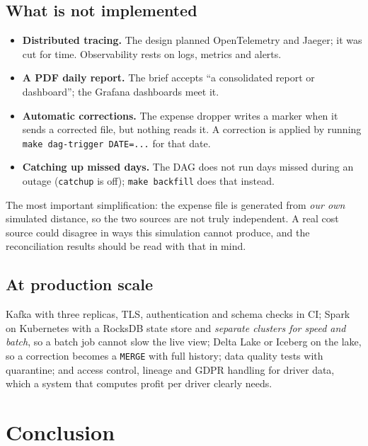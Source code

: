 \documentclass[11pt,a4paper]{article}
\begin{document}
\subsection{What is not implemented}

\begin{itemize}
  \item \textbf{Distributed tracing.} The design planned OpenTelemetry and Jaeger; it
  was cut for time. Observability rests on logs, metrics and alerts.
  \item \textbf{A PDF daily report.} The brief accepts ``a consolidated report or
  dashboard''; the Grafana dashboards meet it.
  \item \textbf{Automatic corrections.} The expense dropper writes a marker when it
  sends a corrected file, but nothing reads it. A correction is applied by running
  \texttt{make dag-trigger DATE=...} for that date.
  \item \textbf{Catching up missed days.} The DAG does not run days missed during an
  outage (\texttt{catchup} is off); \texttt{make backfill} does that instead.
\end{itemize}

The most important simplification: the expense file is generated from \emph{our own}
simulated distance, so the two sources are not truly independent. A real cost source
could disagree in ways this simulation cannot produce, and the reconciliation results
should be read with that in mind.

\subsection{At production scale}

Kafka with three replicas, TLS, authentication and schema checks in CI; Spark on
Kubernetes with a RocksDB state store and \emph{separate clusters for speed and batch},
so a batch job cannot slow the live view; Delta Lake or Iceberg on the lake, so a
correction becomes a \texttt{MERGE} with full history; data quality tests with
quarantine; and access control, lineage and GDPR handling for driver data, which a
system that computes profit per driver clearly needs.

\section{Conclusion}
\end{document}
